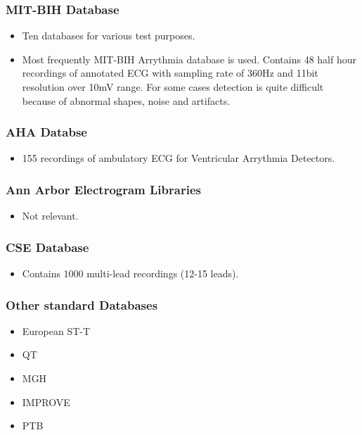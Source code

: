 \documentclass{article}
\begin{document}
\subsubsection{MIT-BIH Database}
\begin{itemize}
\item Ten databases for various test purposes.
\item Most frequently MIT-BIH Arrythmia database is used. Contains 48 half hour recordings of annotated ECG with sampling rate of 360Hz and 11bit resolution over 10mV range. For some cases detection is quite difficult because of abnormal shapes, noise and artifacts.
\end{itemize}
\subsubsection{AHA Databse}
\begin{itemize}
\item 155 recordings of ambulatory ECG for Ventricular Arrythmia Detectors.
\end{itemize}
\subsubsection{Ann Arbor Electrogram Libraries}
\begin{itemize}
\item Not relevant.
\end{itemize}
\subsubsection{CSE Database}
\begin{itemize}
\item Contains 1000 multi-lead recordings (12-15 leads).
\end{itemize}
\subsubsection{Other standard Databases}
\begin{itemize}
\item European ST-T
\item QT
\item MGH
\item IMPROVE
\item PTB
\end{itemize}
\end{document}
